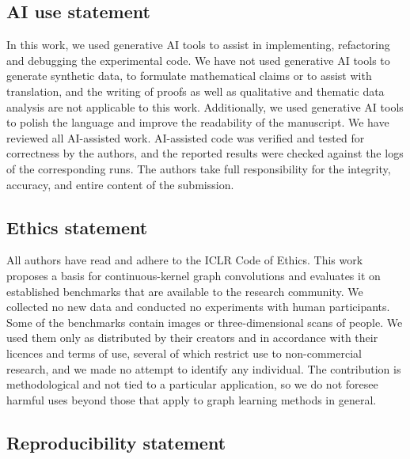 \documentclass{article} %
\begin{document}
\newpage
\subsection*{AI use statement}

In this work, we used generative AI tools to assist in implementing,
refactoring and debugging the experimental code. We have not used generative
AI tools to generate synthetic data, to formulate mathematical claims or to
assist with translation, and the writing of proofs as well as qualitative and
thematic data analysis are not applicable to this work. Additionally, we used
generative AI tools to polish the language and improve the readability of the
manuscript. We have reviewed all AI-assisted work. AI-assisted code was
verified and tested for correctness by the authors, and the reported results
were checked against the logs of the corresponding runs. The authors take full
responsibility for the integrity, accuracy, and entire content of the
submission.

\subsection*{Ethics statement}

All authors have read and adhere to the ICLR Code of Ethics. This work proposes
a basis for continuous-kernel graph convolutions and evaluates it on
established benchmarks that are available to the research community. We
collected no new data and conducted no experiments with human participants.
Some of the benchmarks contain images or three-dimensional scans of people. We
used them only as distributed by their creators and in accordance with their
licences and terms of use, several of which restrict use to non-commercial
research, and we made no attempt to identify any individual. The contribution
is methodological and not tied to a particular application, so we do not
foresee harmful uses beyond those that apply to graph learning methods in
general.

\subsection*{Reproducibility statement}
\end{document}
